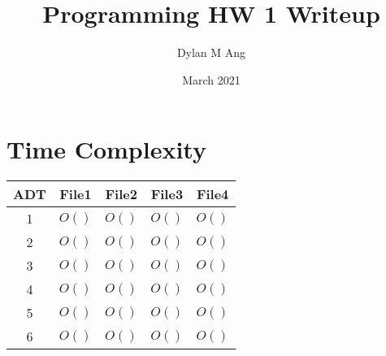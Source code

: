 \documentclass[12pt]{article}
\title{Programming HW 1 Writeup}
\author{Dylan M Ang}
\date{March 2021}
\begin{document}
\maketitle

\tableofcontents

\section{Time Complexity}
    
\begin{center}
    \begin{tabular}{c c c c c}
        ADT & File1 & File2 & File3 & File4 \\
        \hline
        1   & $O()$ & $O()$ & $O()$ & $O()$ \\
        2   & $O()$ & $O()$ & $O()$ & $O()$ \\
        3   & $O()$ & $O()$ & $O()$ & $O()$ \\
        4   & $O()$ & $O()$ & $O()$ & $O()$ \\
        5   & $O()$ & $O()$ & $O()$ & $O()$ \\
        6   & $O()$ & $O()$ & $O()$ & $O()$
    \end{tabular}
\end{center}


\end{document}
